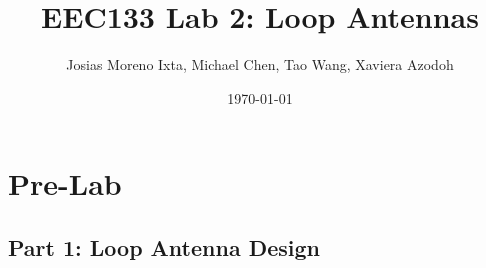 \documentclass{article} %
\begin{document}
\title{EEC133 Lab 2: Loop Antennas}
\author{Josias Moreno Ixta, Michael Chen, Tao Wang, Xaviera Azodoh}
\date{\today}

\maketitle
\tableofcontents

\section*{Pre-Lab}

\subsection*{Part 1: Loop Antenna Design}
\end{document}
